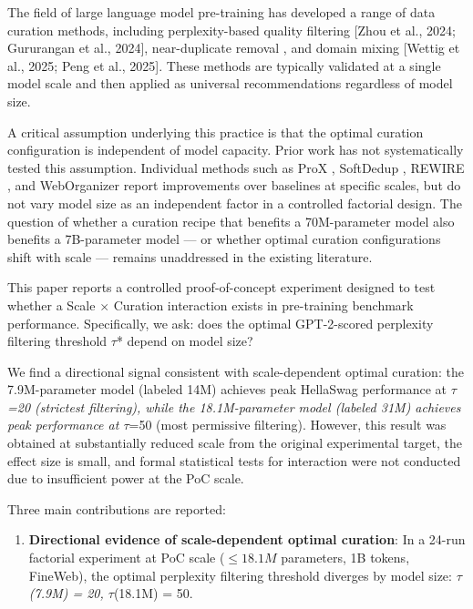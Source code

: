 
The field of large language model pre-training has developed a range of data curation methods, including perplexity-based quality filtering [Zhou et al., 2024; Gururangan et al., 2024], near-duplicate removal \citep{He2024SoftDedup}, and domain mixing [Wettig et al., 2025; Peng et al., 2025]. These methods are typically validated at a single model scale and then applied as universal recommendations regardless of model size.

A critical assumption underlying this practice is that the optimal curation configuration is independent of model capacity. Prior work has not systematically tested this assumption. Individual methods such as ProX \citep{Zhou2024ProX}, SoftDedup \citep{He2024SoftDedup}, REWIRE \citep{Nguyen2025REWIRE}, and WebOrganizer \citep{Wettig2025Organize} report improvements over baselines at specific scales, but do not vary model size as an independent factor in a controlled factorial design. The question of whether a curation recipe that benefits a 70M-parameter model also benefits a 7B-parameter model --- or whether optimal curation configurations shift with scale --- remains unaddressed in the existing literature.

This paper reports a controlled proof-of-concept experiment designed to test whether a Scale $\times$ Curation interaction exists in pre-training benchmark performance. Specifically, we ask: does the optimal GPT-2-scored perplexity filtering threshold $\tau$* depend on model size?

We find a directional signal consistent with scale-dependent optimal curation: the 7.9M-parameter model (labeled 14M) achieves peak HellaSwag performance at $\tau$\textit{=20 (strictest filtering), while the 18.1M-parameter model (labeled 31M) achieves peak performance at $\tau$}=50 (most permissive filtering). However, this result was obtained at substantially reduced scale from the original experimental target, the effect size is small, and formal statistical tests for interaction were not conducted due to insufficient power at the PoC scale.

Three main contributions are reported:

\begin{enumerate}
\item \textbf{Directional evidence of scale-dependent optimal curation}: In a 24-run factorial experiment at PoC scale ($\leq 18.1M$ parameters, 1B tokens, FineWeb), the optimal perplexity filtering threshold diverges by model size: $\tau$\textit{(7.9M) = 20, $\tau$}(18.1M) = 50.
\end{enumerate}

